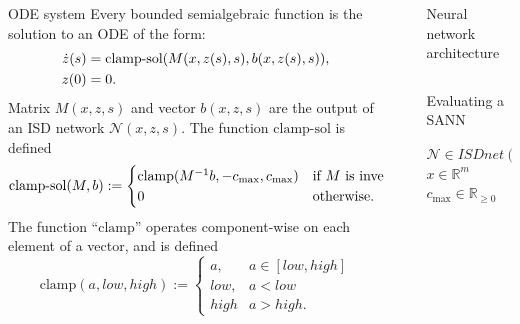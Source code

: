 \documentclass[final]{beamer}
\newcommand{\defeq}{:=}
\newcommand{\isdnet}{ISDnet}
\newlength{\sepwidth}
\newlength{\lrcolwidth}
\newlength{\mcolwidth}
\newcommand{\separatorcolumn}{\begin{column}{\sepwidth}\end{column}}
\begin{document}
\begin{frame}[t]
\begin{columns}[t]
\begin{column}{\mcolwidth}

  \begin{block}{ODE system}
    Every bounded semialgebraic function is the solution to an ODE of the form:
    \begin{align}
      \dot z(s)&=\hbox{clamp-sol}(M(x,z(s),s),b(x,z(s),s)), \label{ODE-alt} \\
      z(0)&=0. \label{ODE-alt2}
    \end{align}
    Matrix $M(x,z,s)$ and vector $b(x,z,s)$ are the output of an ISD network ${\mathcal N}(x,z,s)$. The function $\textrm{clamp-sol}$ is defined 
    \begin{equation}
    \textrm{clamp-sol}(M,b) \defeq \begin{cases}
            \hbox{clamp}(M^{-1}b,-c_{\max},c_{\max}) & \text{if $M$ is invertible} \\
            0 & \text{otherwise.}
        \end{cases}
    \end{equation}
    The function ``$\textrm{clamp}$'' operates component-wise on each element of a vector, and is defined
    \begin{equation}
        \textrm{clamp}(a, low, high) \defeq \begin{cases} a, & a \in [low, high] \\
        low, & a < low \\
        high & a > high.
        \end{cases}
    \end{equation}
  \end{block}
\end{column}

\separatorcolumn

\begin{column}{\lrcolwidth}

  \begin{block}{Neural network architecture}
    \begin{columns}
      \begin{column}{0.7\textwidth}
        \begin{algorithm}[H]
          \caption{Evaluating a SANN}
          \label{alg-sann}
          \begin{algorithmic}[1]
              \Require $\mathcal{N} \in \isdnet(m, n, k)$ \\
              $x \in \mathbb{R}^m$ \\
              $c_{\max} \in \mathbb{R}_{\ge 0}$
              

\end{algorithmic}
\end{algorithm}
\end{column}
\end{columns}
\end{block}
\end{column}
\end{columns}
\end{frame}
\end{document}
